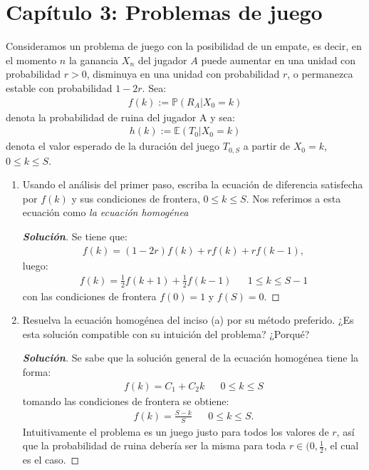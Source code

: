 \documentclass[12pt, letterpaper]{article}
\newcommand{\p}{\mathbb{P}}
\newenvironment{manualtheorem}[1]{%
  \renewcommand\themanualtheoreminner{#1}%
  \manualtheoreminner
}{\endmanualtheoreminner}
\newenvironment{solucion}
  {\renewcommand\qedsymbol{$\square$}\begin{proof}[\textbf{Solución}]}
  {\end{proof}}
\begin{document}
    \section*{Capítulo 3: Problemas de juego}
    \begin{manualtheorem}{3.1} Consideramos un problema de juego con la posibilidad de un empate, es decir, en el momento $n$ la ganancia $X_n$ del jugador $A$ puede aumentar en una unidad con probabilidad $r> 0$, disminuya en una unidad con probabilidad $r$, o permanezca estable con probabilidad $1 - 2r$. Sea:
    \begin{align*}
        f(k):=\p(R_A|X_0=k)
    \end{align*}
    denota la probabilidad de ruina del jugador A y sea:
    \begin{align*}
        h(k):=\mathbb{E}(T_0|X_0=k)
    \end{align*}
    denota el valor esperado de la duración del juego $T_{0,S}$ a partir de $X_0=k$, $0\leq k \leq S$.
    
    \renewcommand{\labelenumi}{(\alph{enumi})}
    \begin{enumerate}
        
        \item Usando el análisis del primer paso, escriba la ecuación de diferencia satisfecha por $f(k)$ y sus condiciones de frontera, $0 \leq k \leq S$. Nos referimos a esta ecuación como \textit{la ecuación homogénea}
        \begin{solucion}
            Se tiene que:
            \begin{align*}
                f(k)=(1-2r)f(k)+rf(k)+rf(k-1),
            \end{align*}
            luego:
            \begin{align*}
                f(k)= \frac{1}{2} f(k+1)+ \frac{1}{2}f(k-1)& &1\leq k\leq S-1
            \end{align*}
            con las condiciones de frontera $f(0)=1$ y $f(S)=0$.
        \end{solucion}
        
        \item Resuelva la ecuación homogénea del inciso (a) por su método preferido. ¿Es esta solución compatible con su intuición del problema? ¿Porqué?
        \begin{solucion}
            Se sabe que la solución general de la ecuación homogénea tiene la forma:
            \begin{align*}
                f(k)=C_1+C_2k & &  0\leq k\leq S
            \end{align*}
            tomando las condiciones de frontera se obtiene:
            \begin{align*}
                f(k)=\frac{S-k}{S} & &  0\leq k\leq S.
            \end{align*}
            Intuitivamente el problema es un juego justo para todos los valores de $r$, así que la probabilidad de ruina debería ser la misma para toda $r\in(0,\frac{1}{2}$, el cual es el caso.
        \end{solucion}
        

\end{enumerate}
\end{manualtheorem}
\end{document}
